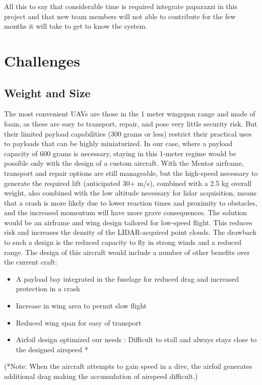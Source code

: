 \documentclass[a4paper,11pt]{report}
\begin{document}
All this to say that considerable time is required integrate paparazzi in this project and that new team members will not able to contribute for the few months it will take to get to know the system.

\section{Challenges}

\subsection{Weight and Size}

The most convenient UAVs are those in the 1 meter wingspan range and made of foam, as these are easy to transport, repair, and pose very little security risk. But their limited payload capabilities (300 grams or less) restrict their practical uses to payloads that can be highly miniaturized. In our case, where a payload capacity of 600 grams is necessary, staying in this 1-meter regime would be possible only with the design of a custom aircraft. With the Mentor airframe, transport and repair options are still manageable, but the high-speed necessary to generate the required lift (anticipated 30+ m/s), combined with a 2.5 kg overall weight, also combined with the low altitude necessary for lidar acquisition, means that a crash is more likely due to lower reaction times and proximity to obstacles, and the increased momentum will have more grave consequences. The solution would be an airframe and wing design tailored for low-speed flight. This reduces risk and increases the density of the LIDAR-acquired point clouds. The drawback to such a design is the reduced capacity to fly in strong winds and a reduced range. The design of this aircraft would include a number of other benefits over the current craft: 

\begin{itemize}
 \item A payload bay integrated in the fuselage for reduced drag and increased protection in a crash
 \item Increase in wing area to permit slow flight
 \item Reduced wing span for easy of transport
 \item Airfoil design optimized our needs : Difficult to stall and always stays close to the designed airspeed *
\end{itemize}

(*Note: When the aircraft attempts to gain speed in a dive, the airfoil generates additional drag making the accumulation of airspeed difficult.)
\end{document}
